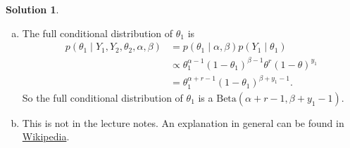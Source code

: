 \documentclass{article}
\theoremstyle{plain}
\theoremstyle{definition}
\newtheorem*{sol*}{Solution}
\begin{document}
\begin{sol*}
\begin{enumerate}[(a)]
\item The full conditional distribution of $\theta_1$ is
\begin{align*}
p(\theta_1\mid Y_1,Y_2,\theta_2,\alpha,\beta)&=p(\theta_1\mid \alpha,\beta)p(Y_1\mid \theta_1)\\
&\propto \theta_1^{\alpha-1}(1-\theta_1)^{\beta-1}\theta^r(1-\theta)^{y_1}\\
&=\theta_1^{\alpha+r-1}(1-\theta_1)^{\beta+y_1-1}.
\end{align*}
So the full conditional distribution of $\theta_1$ is a $\mathrm{Beta}(\alpha+r-1,\beta+y_1-1)$.
\item This is not in the lecture notes. An explanation in general can be found in \href{https://en.wikipedia.org/wiki/Gibbs_sampling#Implementation}{Wikipedia}.
\end{enumerate}
\end{sol*}
\end{document}
